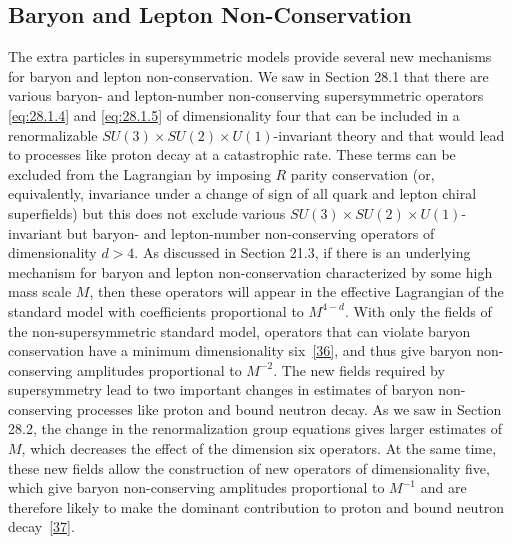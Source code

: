 
\subsection{Baryon and Lepton Non-Conservation}

The extra particles in supersymmetric models provide several new mechanisms
for baryon and lepton non-conservation. We saw in Section 28.1 that there are
various baryon- and lepton-number non-conserving supersymmetric operators
\eqref{eq:28.1.4} and \eqref{eq:28.1.5} of dimensionality four that can be
included in a renormalizable
\(SU(3)\times SU(2)\times U(1)\)-invariant theory and that
would lead to processes like proton decay at a catastrophic rate. These
terms can be excluded from the Lagrangian by imposing \(R\) parity
conservation (or, equivalently, invariance under a change of sign of all
quark and lepton chiral superfields) but this does not exclude various
\(SU(3)\times SU(2)\times U(1)\)-invariant but baryon- and
lepton-number non-conserving operators of dimensionality \(d>4\). As
discussed in Section 21.3, if there is an underlying mechanism for baryon
and lepton non-conservation characterized by some high mass scale \(M\),
then these operators will appear in the effective Lagrangian of the
standard model with coefficients proportional to \(M^{4-d}\). With only
the fields of the non-supersymmetric standard model, operators that can
violate baryon conservation have a minimum dimensionality
six~\hyperref[ch28-ref-36]{[36]}, and thus give baryon
non-conserving amplitudes proportional to \(M^{-2}\). The new fields
required by supersymmetry lead to two important changes in estimates of
baryon non-conserving processes like proton and bound neutron decay. As we
saw in Section 28.2, the change in the renormalization group equations gives
larger estimates of \(M\), which decreases the effect of the dimension six
operators. At the same time, these new fields allow the construction of new
operators of dimensionality five, which give baryon non-conserving
amplitudes proportional to \(M^{-1}\) and are therefore likely to make the
dominant contribution to proton and bound neutron
decay~\hyperref[ch28-ref-37]{[37]}.

